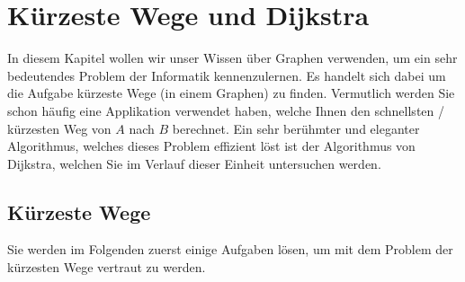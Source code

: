\chapter{Kürzeste Wege und Dijkstra}\label{ch:Lektion}
In diesem Kapitel wollen wir unser Wissen über Graphen verwenden, um ein sehr bedeutendes Problem der Informatik kennenzulernen. Es handelt sich dabei um die Aufgabe kürzeste Wege (in einem Graphen) zu finden. Vermutlich werden Sie schon häufig eine Applikation verwendet haben, welche Ihnen den schnellsten / kürzesten Weg von $A$ nach $B$ berechnet. Ein sehr berühmter und eleganter Algorithmus, welches dieses Problem effizient löst ist der Algorithmus von Dijkstra, welchen Sie im Verlauf dieser Einheit untersuchen werden.

\section{Kürzeste Wege}
Sie werden im Folgenden zuerst einige Aufgaben lösen, um mit dem Problem der kürzesten Wege vertraut zu werden.
